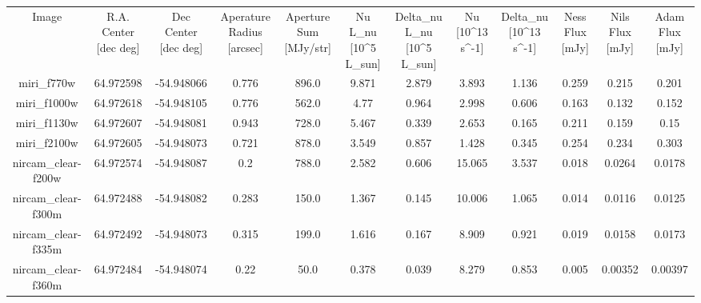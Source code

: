 \begin{table}
\begin{tabular}{cccccccccccc}
Image & R.A. Center [dec deg] & Dec Center [dec deg] & Aperature Radius [arcsec] & Aperture Sum [MJy/str] & Nu L_nu [10^5 L_sun] & Delta_nu L_nu [10^5 L_sun] & Nu [10^13 s^-1] & Delta_nu [10^13 s^-1] & Ness Flux [mJy] & Nils Flux [mJy] & Adam Flux [mJy] \\
miri_f770w & 64.972598 & -54.948066 & 0.776 & 896.0 & 9.871 & 2.879 & 3.893 & 1.136 & 0.259 & 0.215 & 0.201 \\
miri_f1000w & 64.972618 & -54.948105 & 0.776 & 562.0 & 4.77 & 0.964 & 2.998 & 0.606 & 0.163 & 0.132 & 0.152 \\
miri_f1130w & 64.972607 & -54.948081 & 0.943 & 728.0 & 5.467 & 0.339 & 2.653 & 0.165 & 0.211 & 0.159 & 0.15 \\
miri_f2100w & 64.972605 & -54.948073 & 0.721 & 878.0 & 3.549 & 0.857 & 1.428 & 0.345 & 0.254 & 0.234 & 0.303 \\
nircam_clear-f200w & 64.972574 & -54.948087 & 0.2 & 788.0 & 2.582 & 0.606 & 15.065 & 3.537 & 0.018 & 0.0264 & 0.0178 \\
nircam_clear-f300m & 64.972488 & -54.948082 & 0.283 & 150.0 & 1.367 & 0.145 & 10.006 & 1.065 & 0.014 & 0.0116 & 0.0125 \\
nircam_clear-f335m & 64.972492 & -54.948073 & 0.315 & 199.0 & 1.616 & 0.167 & 8.909 & 0.921 & 0.019 & 0.0158 & 0.0173 \\
nircam_clear-f360m & 64.972484 & -54.948074 & 0.22 & 50.0 & 0.378 & 0.039 & 8.279 & 0.853 & 0.005 & 0.00352 & 0.00397 \\
\end{tabular}
\end{table}
